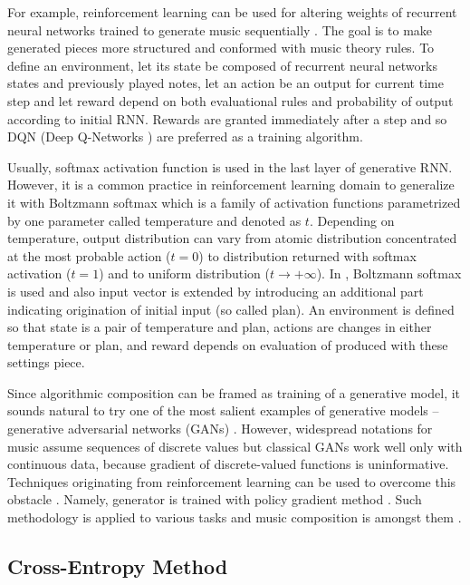 \documentclass{article}
\begin{document}
For example, reinforcement learning can be used for altering weights of recurrent neural networks trained to generate music sequentially \cite{jaques2016generating, kotecha2018bach}. The goal is to make generated pieces more structured and conformed with music theory rules. To define an environment, let its state be composed of recurrent neural networks states and previously played notes, let an action be an output for current time step and let reward depend on both evaluational rules and probability of output according to initial RNN. Rewards are granted immediately after a step and so DQN (Deep Q-Networks \cite{mnih2013playing}) are preferred as a training algorithm.

Usually, softmax activation function is used in the last layer of generative RNN. However, it is a common practice in reinforcement learning domain to generalize it with Boltzmann softmax which is a family of activation functions parametrized by one parameter called temperature and denoted as $t$. Depending on temperature, output distribution can vary from atomic distribution concentrated at the most probable action ($t = 0$) to distribution returned with softmax activation ($t = 1$) and to uniform distribution ($t \to +\infty$). In \cite{kumar2019polyphonic}, Boltzmann softmax is used and also input vector is extended by introducing an additional part indicating origination of initial input (so called plan). An environment is defined so that state is a pair of temperature and plan, actions are changes in either temperature or plan, and reward depends on evaluation of produced with these settings piece.

Since algorithmic composition can be framed as training of a generative model, it sounds natural to try one of the most salient examples of generative models -- generative adversarial networks (GANs) \cite{goodfellow2014gan}. However, widespread notations for music assume sequences of discrete values but classical GANs work well only with continuous data, because gradient of discrete-valued functions is uninformative. Techniques originating from reinforcement learning can be used to overcome this obstacle \cite{yu2016seqgan,hjelm2017boundary}. Namely, generator is trained with policy gradient method \cite{williams1992simple}. Such methodology is applied to various tasks and music composition is amongst them \cite{limaguimaraes2017objective}.

\subsection{Cross-Entropy Method}
\label{subsec:crossentropy}
\end{document}
